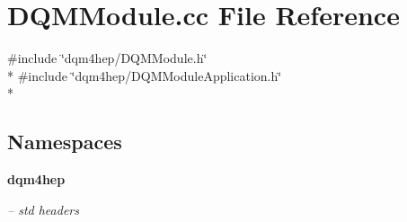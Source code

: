 \section{D\+Q\+M\+Module.\+cc File Reference}
\label{DQMModule_8cc}
{\ttfamily \#include \char`\"{}dqm4hep/\+D\+Q\+M\+Module.\+h\char`\"{}}\\*
{\ttfamily \#include \char`\"{}dqm4hep/\+D\+Q\+M\+Module\+Application.\+h\char`\"{}}\\*
\subsection*{Namespaces}
\begin{DoxyCompactItemize}
\item 
 {\bf dqm4hep}
\begin{DoxyCompactList}\small\item\em -- std headers \end{DoxyCompactList}\end{DoxyCompactItemize}
